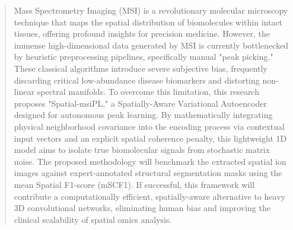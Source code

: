 %
\begin{abstract}
\addchaptertocentry{\abstractname} %

Mass Spectrometry Imaging (MSI) is a revolutionary molecular microscopy technique that maps the spatial distribution of biomolecules within intact tissues, offering profound insights for precision medicine. However, the immense high-dimensional data generated by MSI is currently bottlenecked by heuristic preprocessing pipelines, specifically manual "peak picking." These classical algorithms introduce severe subjective bias, frequently discarding critical low-abundance disease biomarkers and distorting non-linear spectral manifolds. To overcome this limitation, this research proposes "Spatial-msiPL," a Spatially-Aware Variational Autoencoder designed for autonomous peak learning. By mathematically integrating physical neighborhood covariance into the encoding process via contextual input vectors and an explicit spatial coherence penalty, this lightweight 1D model aims to isolate true biomolecular signals from stochastic matrix noise. The proposed methodology will benchmark the extracted spatial ion images against expert-annotated structural segmentation masks using the mean Spatial F1-score (mSCF1). If successful, this framework will contribute a computationally efficient, spatially-aware alternative to heavy 3D convolutional networks, eliminating human bias and improving the clinical scalability of spatial omics analysis.
\end{abstract}